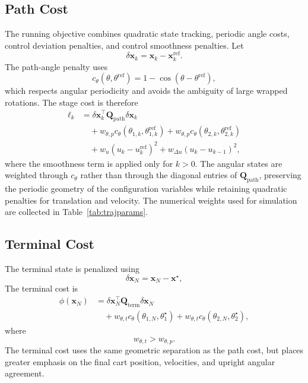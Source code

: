 \documentclass[conference]{IEEEtran}
\begin{document}
\subsection{Path Cost}
The running objective combines quadratic state tracking, periodic angle costs, control deviation penalties, and control smoothness penalties. Let
\begin{equation}
\delta \bm{x}_k = \bm{x}_k - \bm{x}_k^{\mathrm{ref}}.
\end{equation}
The path-angle penalty uses
\begin{equation}
c_\theta(\theta,\theta^{\mathrm{ref}}) = 1 - \cos(\theta-\theta^{\mathrm{ref}}),
\end{equation}
which respects angular periodicity and avoids the ambiguity of large wrapped rotations. The stage cost is therefore
\begin{align}
\ell_k &=
\delta \bm{x}_k^\top \bm{Q}_{\mathrm{path}} \delta \bm{x}_k \nonumber \\
&\quad
+ w_{\theta,p} c_\theta(\theta_{1,k},\theta_{1,k}^{\mathrm{ref}})
+ w_{\theta,p} c_\theta(\theta_{2,k},\theta_{2,k}^{\mathrm{ref}})
\nonumber \\
&\quad
+ w_u (u_k-u_k^{\mathrm{ref}})^2
+ w_{\Delta u}(u_k-u_{k-1})^2,
\label{eq:pathcost}
\end{align}
where the smoothness term is applied only for $k>0$. The angular states are weighted through $c_\theta$ rather than through the diagonal entries of $\bm{Q}_{\mathrm{path}}$, preserving the periodic geometry of the configuration variables while retaining quadratic penalties for translation and velocity. The numerical weights used for simulation are collected in Table~\ref{tab:trajparams}.

\subsection{Terminal Cost}
The terminal state is penalized using
\begin{equation}
\delta \bm{x}_N = \bm{x}_N - \bm{x}^\star,
\end{equation}
The terminal cost is
\begin{align}
\phi(\bm{x}_N) &=
\delta \bm{x}_N^\top \bm{Q}_{\mathrm{term}} \delta \bm{x}_N
\nonumber \\
&\quad
+ w_{\theta,t} c_\theta(\theta_{1,N},\theta_1^\star)
+ w_{\theta,t} c_\theta(\theta_{2,N},\theta_2^\star),
\label{eq:terminal}
\end{align}
where
\begin{equation}
w_{\theta,t} > w_{\theta,p}.
\end{equation}
The terminal cost uses the same geometric separation as the path cost, but places greater emphasis on the final cart position, velocities, and upright angular agreement.
\end{document}
